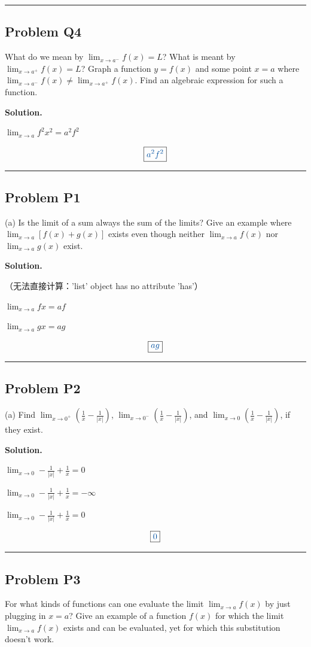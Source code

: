 \documentclass[11pt, a4paper]{ctexart}
\newcommand{\problem}[1]{\subsection*{Problem #1}}
\newcommand{\solution}{\par\noindent\textbf{Solution.}\par\smallskip}
\begin{document}
\vspace{0.6em}\hrule\vspace{0.6em}
\problem{Q4}

What do we mean by $\lim_{x \to a^-} f(x) = L$? What is meant by $\lim_{x \to a^+} f(x) = L$? Graph a function $y = f(x)$ and some point $x = a$ where $\lim_{x \to a^-} f(x) \neq \lim_{x \to a^+} f(x)$. Find an algebraic expression for such a function.

\solution
$\lim_{x \to a} f^{2} x^{2} = a^{2} f^{2}$

\[\boxed{\textcolor{anscolor}{a^{2} f^{2}}}\]

\vspace{0.6em}\hrule\vspace{0.6em}
\problem{P1}

(a) Is the limit of a sum always the sum of the limits? Give an example where $\lim_{x \to a}[f(x) + g(x)]$ exists even though neither $\lim_{x \to a} f(x)$ nor $\lim_{x \to a} g(x)$ exist.

\solution
（无法直接计算：'list' object has no attribute 'has'）

$\lim_{x \to a} f x = a f$

$\lim_{x \to a} g x = a g$

\[\boxed{\textcolor{anscolor}{a g}}\]

\vspace{0.6em}\hrule\vspace{0.6em}
\problem{P2}

(a) Find $\lim_{x \to 0^+}(\frac{1}{x} - \frac{1}{|x|})$, $\lim_{x \to 0^-}(\frac{1}{x} - \frac{1}{|x|})$, and $\lim_{x \to 0}(\frac{1}{x} - \frac{1}{|x|})$, if they exist.

\solution
$\lim_{x \to 0} - \frac{1}{\left|{x}\right|} + \frac{1}{x} = 0$

$\lim_{x \to 0} - \frac{1}{\left|{x}\right|} + \frac{1}{x} = -\infty$

$\lim_{x \to 0} - \frac{1}{\left|{x}\right|} + \frac{1}{x} = 0$

\[\boxed{\textcolor{anscolor}{0}}\]

\vspace{0.6em}\hrule\vspace{0.6em}
\problem{P3}

For what kinds of functions can one evaluate the limit $\lim_{x \to a} f(x)$ by just plugging in $x = a$? Give an example of a function $f(x)$ for which the limit $\lim_{x \to a} f(x)$ exists and can be evaluated, yet for which this substitution doesn't work.
\end{document}
